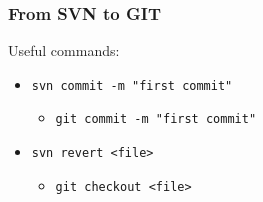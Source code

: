 \documentclass[pdf]{beamer}
\newcommand{\mono}[1]{\texttt{#1}}
\begin{document}
\begin{frame}
  \frametitle{From SVN to GIT}
  Useful commands:
  \begin{itemize}
    \item \mono{svn commit -m "first commit"}
      \begin{itemize}
      \item \mono{git commit -m "first commit"}
      \end{itemize}
    
    \item \mono{svn revert <file>}
      \begin{itemize}
      \item \mono{git checkout <file>}
      \end{itemize}
    \end{itemize}

\end{frame}
\end{document}

